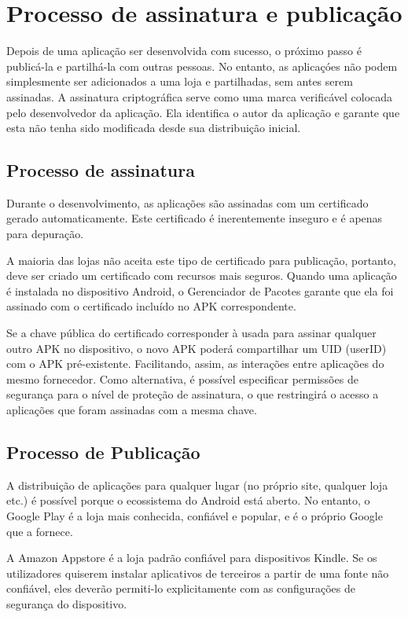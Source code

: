 \section{Processo de assinatura e publicação}
Depois de uma aplicação ser desenvolvida com sucesso, o próximo passo é publicá-la e partilhá-la com outras pessoas. No entanto, as aplicaçóes não podem simplesmente ser adicionados a uma loja e partilhadas, sem antes serem assinadas.
A assinatura criptográfica serve como uma marca verificável colocada pelo desenvolvedor da aplicação. Ela identifica o autor da aplicação e garante que esta não tenha sido modificada desde sua distribuição inicial.

\subsection{Processo de assinatura}
Durante o desenvolvimento, as aplicações são assinadas com um certificado gerado automaticamente. Este certificado é inerentemente inseguro e é apenas para depuração. 

A maioria das lojas não aceita este tipo de certificado para publicação, portanto, deve ser criado um certificado com recursos mais seguros. Quando uma aplicação é instalada no dispositivo Android, o Gerenciador de Pacotes garante que ela foi assinado com o certificado incluído no APK correspondente. 

Se a chave pública do certificado corresponder à usada para assinar qualquer outro APK no dispositivo, o novo APK poderá compartilhar um UID (userID) com o APK pré-existente. 
Facilitando, assim, as interações entre aplicações do mesmo fornecedor. Como alternativa, é possível especificar permissões de segurança para o nível de proteção de assinatura, o que restringirá o acesso a aplicações que foram assinadas com a mesma chave.


\subsection{Processo de Publicação}
A distribuição de aplicações para qualquer lugar (no próprio site, qualquer loja etc.) é possível porque o ecossistema do Android está aberto. No entanto, o Google Play é a loja mais conhecida, confiável e popular, e é o próprio Google que a fornece. 

A Amazon Appstore é a loja padrão confiável para dispositivos Kindle. Se os utilizadores quiserem instalar aplicativos de terceiros a partir de uma fonte não confiável, eles deverão permiti-lo explicitamente com as configurações de segurança do dispositivo.

